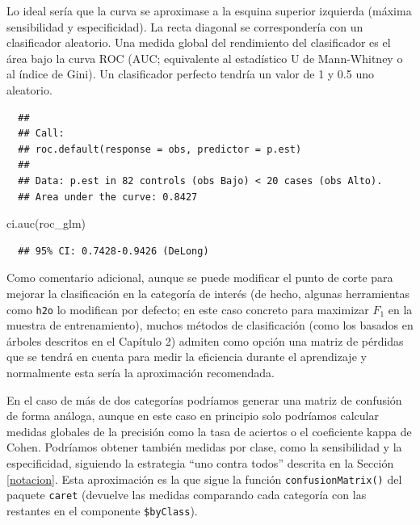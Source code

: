 \documentclass[
]{book}
\newenvironment{Shaded}{\begin{snugshade}}{\end{snugshade}}
\newcommand{\CommentTok}[1]{\textcolor[rgb]{0.56,0.35,0.01}{\textit{#1}}}
\newcommand{\FunctionTok}[1]{\textcolor[rgb]{0.00,0.00,0.00}{#1}}
\newcommand{\NormalTok}[1]{#1}
\theoremstyle{break}
\theoremstyle{nonumberplain}
\renewcommand{\CommentTok}[1]{\textcolor[rgb]{0.41,0.41,0.41}{\texttt{#1}}}
\begin{document}
Lo ideal sería que la curva se aproximase a la esquina superior izquierda (máxima sensibilidad y especificidad).
La recta diagonal se correspondería con un clasificador aleatorio.
Una medida global del rendimiento del clasificador es el área bajo la curva ROC (AUC; equivalente al estadístico U de Mann-Whitney o al índice de Gini).
Un clasificador perfecto tendría un valor de 1 y 0.5 uno aleatorio.

\begin{Shaded}
\end{Shaded}

\begin{verbatim}
  ## 
  ## Call:
  ## roc.default(response = obs, predictor = p.est)
  ## 
  ## Data: p.est in 82 controls (obs Bajo) < 20 cases (obs Alto).
  ## Area under the curve: 0.8427
\end{verbatim}

\begin{Shaded}
\begin{Highlighting}[]
\FunctionTok{ci.auc}\NormalTok{(roc\_glm)}
\end{Highlighting}
\end{Shaded}

\begin{verbatim}
  ## 95% CI: 0.7428-0.9426 (DeLong)
\end{verbatim}

Como comentario adicional, aunque se puede modificar el punto de corte para mejorar la clasificación en la categoría de interés (de hecho, algunas herramientas como \texttt{h2o} lo modifican por defecto; en este caso concreto para maximizar \(F_1\) en la muestra de entrenamiento), muchos métodos de clasificación (como los basados en árboles descritos en el Capítulo 2) admiten como opción una matriz de pérdidas que se tendrá en cuenta para medir la eficiencia durante el aprendizaje y normalmente esta sería la aproximación recomendada.

En el caso de más de dos categorías podríamos generar una matriz de confusión de forma análoga, aunque en este caso en principio solo podríamos calcular medidas globales de la precisión como la tasa de aciertos o el coeficiente kappa de Cohen.
Podríamos obtener también medidas por clase, como la sensibilidad y la especificidad, siguiendo la estrategia ``uno contra todos'' descrita en la Sección \ref{notacion}.
Esta aproximación es la que sigue la función \texttt{confusionMatrix()} del paquete \texttt{caret} (devuelve las medidas comparando cada categoría con las restantes en el componente \texttt{\$byClass}).
\end{document}
